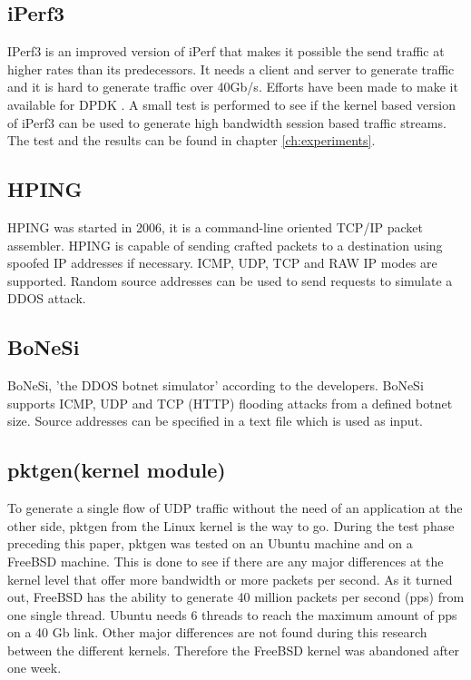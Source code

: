 \subsection{iPerf3}\label{sub:iperf3}
IPerf3 is an improved version of iPerf that makes it possible the send traffic at higher rates than its predecessors. It needs a client and server to generate traffic and it is hard to generate traffic over 40Gb/s. Efforts have been made to make it available for DPDK \cite{jelte}.     
A small test is performed to see if the kernel based version of iPerf3 can be used to generate high bandwidth session based traffic streams. The test and the results can be found in chapter \ref{ch:experiments}.

\subsection{HPING}\label{sub:hping}
HPING was started in 2006, it is a command-line oriented TCP/IP packet assembler. HPING is capable of sending crafted packets to a destination using spoofed IP addresses if necessary. ICMP, UDP, TCP and RAW IP modes are supported. Random source addresses can be used to send requests to simulate a DDOS attack.    

\subsection{BoNeSi}\label{sub:bonesi}
BoNeSi, 'the DDOS botnet simulator' according to the developers. BoNeSi supports ICMP, UDP and TCP (HTTP) flooding attacks from a defined botnet size. Source addresses can be specified in a text file which is used as input. 

\subsection{pktgen(kernel module)}\label{sub:pktgen}
To generate a single flow of UDP traffic without the need of an application at the other side, pktgen from the Linux kernel is the way to go. During the test phase preceding this paper, pktgen was tested on an Ubuntu machine and on a FreeBSD machine. 
This is done to see if there are any major differences at the kernel level that offer more bandwidth or more packets per second. As it turned out, FreeBSD has the ability to generate 40 million packets per second (pps) from one single thread. Ubuntu needs 6 threads to reach the maximum amount of pps on a 40 Gb link. Other major differences are not found during this research between the different kernels. Therefore the FreeBSD kernel was abandoned after one week. 

